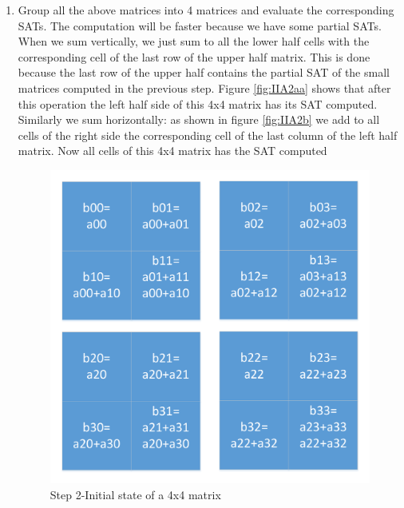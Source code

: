 \begin{enumerate}
 
   
   	\item Group all the above matrices into 4 matrices and evaluate the corresponding SATs.
   	The computation will be faster because we have some partial SATs.
   	When we sum vertically, we just sum to all the lower half cells with the corresponding cell of the last row of the upper half matrix. This is done because the last row of the upper half contains the partial SAT of the small matrices computed in the previous step.
   	Figure \ref{fig:IIA2aa} shows that after this operation the left half side of this 4x4 matrix has its SAT computed.
   	Similarly we sum horizontally: as shown in figure \ref{fig:IIA2b} we add to all cells of the right side the corresponding cell of the last column of the left half matrix. Now all cells of this 4x4 matrix has the SAT computed
   	
   	   \begin{figure}[h]
   	 \centering
   	   	\includegraphics[scale=0.40]{imm/iia/iia_step2a}  
   	   	\caption{Step 2-Initial state of a 4x4 matrix} 
   	   	\label{fig:IIA2a}
   	   \end{figure}
   	   

\end{enumerate}
